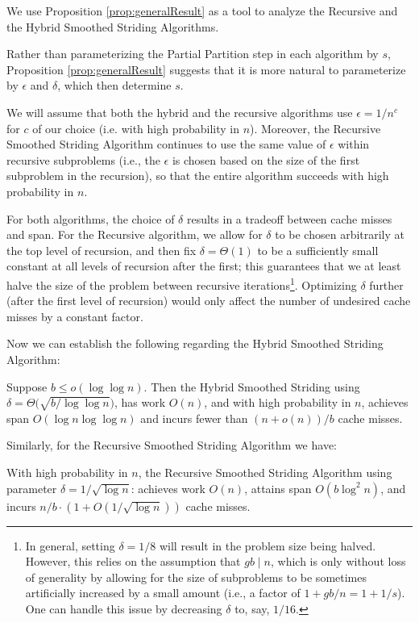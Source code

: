 \documentclass[twoside,leqno,twocolumn]{article}
\begin{document}
We use Proposition \ref{prop:generalResult} as a tool to analyze
the Recursive and the Hybrid Smoothed Striding Algorithms.

Rather than parameterizing the Partial Partition step in each
algorithm by $s$, Proposition \ref{prop:generalResult} suggests
that it is more natural to parameterize by $\epsilon$ and
$\delta$, which then determine $s$.

We will assume that both the hybrid and the recursive algorithms
use $\epsilon = 1/n^c$ for $c$ of our choice (i.e. with high
probability in $n$). Moreover, the Recursive Smoothed Striding
Algorithm continues to use the same value of $\epsilon$ within
recursive subproblems (i.e., the $\epsilon$ is chosen based on
the size of the first subproblem in the recursion), so that the
entire algorithm succeeds with high probability in $n$.

For both algorithms, the choice of $\delta$ results in a tradeoff
between cache misses and span. For the Recursive algorithm, we
allow for $\delta$ to be chosen arbitrarily at the top level of
recursion, and then fix $\delta  = \Theta(1)$ to be a
sufficiently small constant at all levels of recursion after the
first; this guarantees that we at least halve the size of the
problem between recursive iterations\footnote{In general, setting
$\delta = 1/8$ will result in the problem size being halved.
However, this relies on the assumption that $gb \mid n$, which is
only without loss of generality by allowing for the size of
subproblems to be sometimes artificially increased by a small
amount (i.e., a factor of $1 + gb / n = 1 + 1/s$). One can handle
this issue by decreasing $\delta$ to, say, $1/16$.}. Optimizing
$\delta$ further (after the first level of recursion) would only
affect the number of undesired cache misses by a constant factor.

Now we can establish the following regarding the Hybrid Smoothed
Striding Algorithm:
\begin{corollary}
Suppose $b \le o(\log \log n)$. Then the Hybrid Smoothed Striding using $\delta
= \Theta\big(\sqrt{b/\log\log n}\big)$, has work $O(n)$, and with high
probability in $n$, achieves span $O(\log n \log\log n)$ and incurs fewer than
$(n+o(n))/b$ cache misses.
\end{corollary}

Similarly, for the Recursive Smoothed Striding Algorithm we have:
\begin{corollary}
  With high probability in $n$, the Recursive Smoothed Striding
  Algorithm using parameter $\delta=1/\sqrt{\log n}$:
  achieves work $O(n)$, attains span $O(b\log^2 n)$, and incurs
  $n/b \cdot (1 + O(1 / \sqrt{\log n}))$ cache misses. 
\end{corollary}
\end{document}
